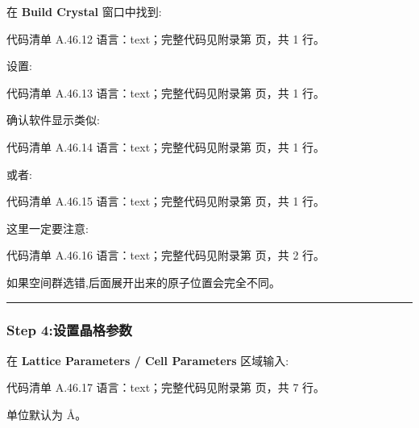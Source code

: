 \documentclass[lang=cn,scheme=chinese,color=blue,device=normal,toc=onecol,math=cm]{elegantbook}
\begin{document}
在 \textbf{Build Crystal} 窗口中找到:\par


\begin{codeindexbox}{代码清单 A.46.12}
语言：text；完整代码见附录第 \pageref{code:46:12} 页，共 1 行。
\end{codeindexbox}


设置:\par


\begin{codeindexbox}{代码清单 A.46.13}
语言：text；完整代码见附录第 \pageref{code:46:13} 页，共 1 行。
\end{codeindexbox}


确认软件显示类似:\par


\begin{codeindexbox}{代码清单 A.46.14}
语言：text；完整代码见附录第 \pageref{code:46:14} 页，共 1 行。
\end{codeindexbox}


或者:\par


\begin{codeindexbox}{代码清单 A.46.15}
语言：text；完整代码见附录第 \pageref{code:46:15} 页，共 1 行。
\end{codeindexbox}


这里一定要注意:\par


\begin{codeindexbox}{代码清单 A.46.16}
语言：text；完整代码见附录第 \pageref{code:46:16} 页，共 2 行。
\end{codeindexbox}


如果空间群选错,后面展开出来的原子位置会完全不同。\par


\medskip\hrule\medskip


\subsubsection{Step 4:设置晶格参数}


在 \textbf{Lattice Parameters /\allowbreak{} Cell Parameters} 区域输入:\par


\begin{codeindexbox}{代码清单 A.46.17}
语言：text；完整代码见附录第 \pageref{code:46:17} 页，共 7 行。
\end{codeindexbox}


单位默认为 Å。\par
\end{document}
